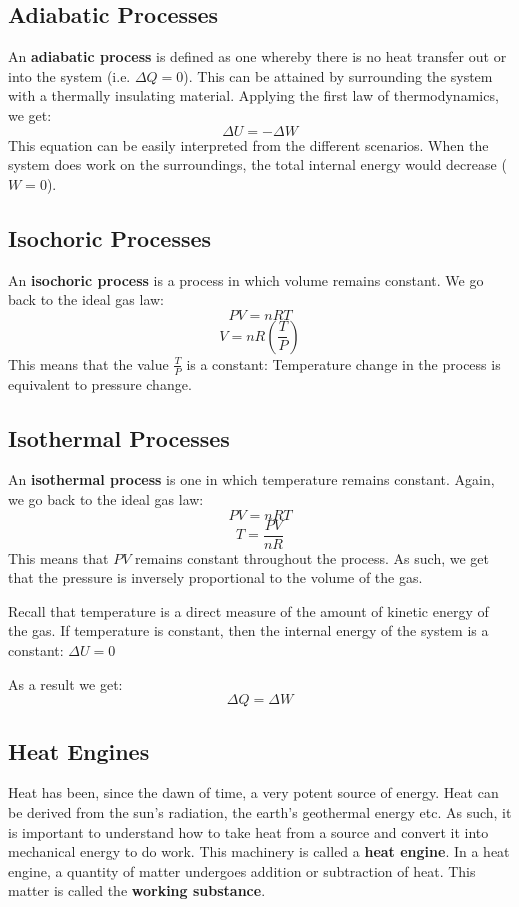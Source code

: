 \subsection{Adiabatic Processes}
An \textbf{adiabatic process} is defined as one whereby there is no heat transfer out or into the system (i.e. $\Delta Q=0$). This can be attained by surrounding the system with a thermally insulating material. Applying the first law of thermodynamics, we get:
$$\Delta U = -\Delta W$$
This equation can be easily interpreted from the different scenarios. When the system does work on the surroundings, the total internal energy would decrease ($W=0$).

\subsection{Isochoric Processes}
An \textbf{isochoric process} is a process in which volume remains constant. We go back to the ideal gas law:
$$PV=nRT$$
$$V=nR\left(\frac{T}{P}\right)$$
This means that the value $\frac{T}{P}$ is a constant: Temperature change in the process is equivalent to pressure change.

\subsection{Isothermal Processes}
An \textbf{isothermal process} is one in which temperature remains constant. Again, we go back to the ideal gas law:
$$PV=nRT$$
$$T=\frac{PV}{nR}$$
This means that $PV$ remains constant throughout the process. As such, we get that the pressure is inversely proportional to the volume of the gas.

Recall that temperature is a direct measure of the amount of kinetic energy of the gas. If temperature is constant, then the internal energy of the system is a constant: $\Delta U=0$

As a result we get:
$$\Delta Q=\Delta W$$

\subsection{Heat Engines}
Heat has been, since the dawn of time, a very potent source of energy. Heat can be derived from the sun's radiation, the earth's geothermal energy etc. As such, it is important to understand how to take heat from a source and convert it into mechanical energy to do work. This machinery is called a \textbf{heat engine}. In a heat engine, a quantity of matter undergoes addition or subtraction of heat. This matter is called the \textbf{working substance}.

